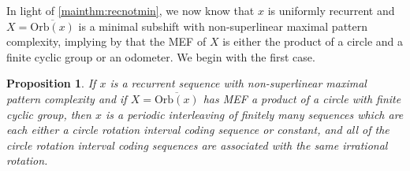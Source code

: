 \documentclass[11pt,reqno]{amsart}
\newtheorem{proposition}[theorem]{Proposition}
\theoremstyle{definition}
\theoremstyle{plain}
\newcommand{\OO}{\mathrm{Orb}}
\newcommand{\Z}{\mathbb{Z}}
\newcommand{\N}{\mathbb{N}}
\newcommand{\AuthornoteA}[2]{{\sf\small\color{magenta}{[#1: #2]}}}
\newcommand{\AuthornoteR}[2]{{\sf\small\color{blue}{[#1: #2]}}}
\newcommand{\Anote}{\AuthornoteA{A}}
\newcommand{\rp}{\AuthornoteR{R}}
\begin{document}

In light of \cref{mainthm:recnotmin}, we now know that $x$ is uniformly recurrent and $X = \overline{\OO(x)}$ is a minimal subshift with non-superlinear maximal pattern complexity, implying by  that the MEF of $X$ is either the product of a circle and a finite cyclic group or an odometer. %
We begin with the first case.

\begin{proposition}\label{part1}
If $x$ is a recurrent sequence with non-superlinear maximal pattern complexity and if $X = \overline{\OO(x)}$ has MEF a product of a circle with finite cyclic group, then $x$ is a periodic interleaving of finitely many sequences which are each either a circle rotation interval coding sequence or constant, and all of the circle rotation interval coding sequences are associated with the same irrational rotation. 
\end{proposition}

\end{document}
